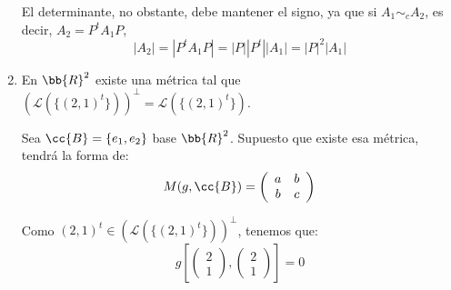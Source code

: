 \begin{ejercicio}
\begin{enumerate}
        El determinante, no obstante, debe mantener el signo, ya que si $A_1\sim_c A_2$, es decir, $A_2=P^tA_1P$,
        \begin{equation*}
            |A_2| = |P^tA_1P| = |P||P^t||A_1|=|P|^2|A_1|
        \end{equation*}

        \item En $\bb{R}^2$ existe una métrica tal que $(\mathcal{L}(\{(2, 1)^t\}))^\perp = \mathcal{L}(\{(2,1)^t\})$.

        Sea $\cc{B}=\{e_1,e_2\}$ base $\bb{R}^2$. Supuesto que existe esa métrica, tendrá la forma de:
        \begin{equation*}
            M(g, \cc{B}) = \left( \begin{array}{cc}
                a & b \\
                b & c
            \end{array} \right)
        \end{equation*}

        Como $(2,1)^t \in (\mathcal{L}(\{(2, 1)^t\}))^\perp$, tenemos que:
        \begin{equation*}
            g\left[\left(
            \begin{array}{c}
                2 \\ 1
            \end{array}\right),
            \left(
            \begin{array}{c}
                2 \\ 1
            \end{array}\right)\right] = 0
        \end{equation*}


\end{enumerate}
\end{ejercicio}
